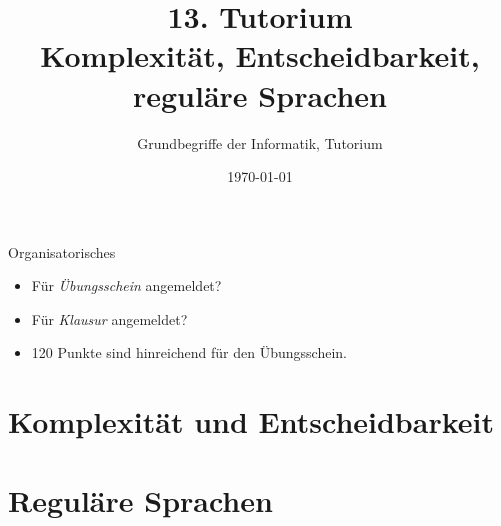 




\title[Komplexität, Entscheidbarkeit, reguläre Sprachen]{13. Tutorium\\ Komplexität, Entscheidbarkeit, reguläre Sprachen}
\subtitle{Grundbegriffe der Informatik, Tutorium \hashtag \mytutnumber}
\date{\today}


\usetikzlibrary{matrix}
\usetikzlibrary{arrows.meta}
\usetikzlibrary{automata}
\usetikzlibrary{tikzmark}


\titleframe
\begin{frame}{Organisatorisches}
	\begin{itemize}
		\item Für \emph{Übungsschein} angemeldet?
		\item Für \emph{Klausur} angemeldet?
		\item 120 Punkte sind hinreichend für den Übungsschein.
	\end{itemize}
\end{frame}

\roadmap

\section{Komplexität und Entscheidbarkeit}




\section{Reguläre Sprachen}




